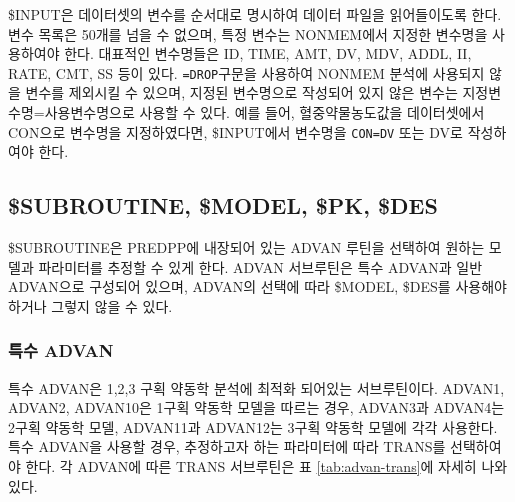 \documentclass[
  11pt,
  krantz2, a4paper, twoside]{krantz}
\theoremstyle{definition}
\theoremstyle{definition}
\theoremstyle{definition}
\theoremstyle{remark}
\begin{document}
\$INPUT은 데이터셋의 변수를 순서대로 명시하여 데이터 파일을 읽어들이도록 한다. 변수 목록은 50개를 넘을 수 없으며, 특정 변수는 NONMEM에서 지정한 변수명을 사용하여야 한다. 대표적인 변수명들은 ID, TIME, AMT, DV, MDV, ADDL, II, RATE, CMT, SS 등이 있다. \texttt{=DROP}구문을 사용하여 NONMEM 분석에 사용되지 않을 변수를 제외시킬 수 있으며, 지정된 변수명으로 작성되어 있지 않은 변수는 지정변수명=사용변수명으로 사용할 수 있다. 예를 들어, 혈중약물농도값을 데이터셋에서 CON으로 변수명을 지정하였다면, \$INPUT에서 변수명을 \texttt{CON=DV} 또는 DV로
작성하여야 한다.

\hypertarget{subroutine-model-pk-des}{%
\subsection{\$SUBROUTINE, \$MODEL, \$PK, \$DES}\label{subroutine-model-pk-des}}


\$SUBROUTINE은 PREDPP에 내장되어 있는 ADVAN 루틴을 선택하여 원하는 모델과 파라미터를 추정할 수 있게 한다. ADVAN 서브루틴은 특수 ADVAN과 일반 ADVAN으로 구성되어 있으며, ADVAN의 선택에 따라 \$MODEL, \$DES를 사용해야 하거나 그렇지 않을 수 있다.

\hypertarget{uxd2b9uxc218-advan}{%
\subsubsection{특수 ADVAN}\label{uxd2b9uxc218-advan}}


특수 ADVAN은 1,2,3 구획 약동학 분석에 최적화 되어있는 서브루틴이다. ADVAN1, ADVAN2, ADVAN10은 1구획 약동학 모델을 따르는 경우, ADVAN3과 ADVAN4는 2구획 약동학 모델, ADVAN11과 ADVAN12는 3구획 약동학 모델에 각각 사용한다. 특수 ADVAN을 사용할 경우, 추정하고자 하는 파라미터에 따라 TRANS를 선택하여야 한다. 각 ADVAN에 따른 TRANS 서브루틴은 표 \ref{tab:advan-trans}에 자세히 나와있다.
\end{document}
